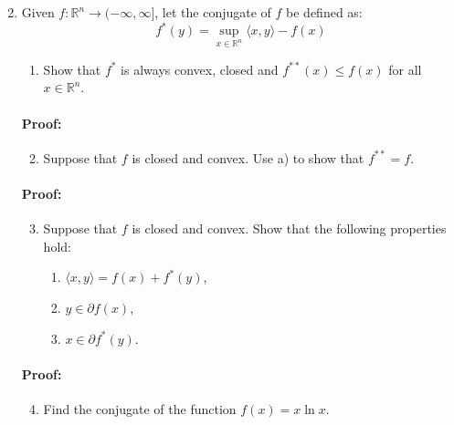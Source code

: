 \documentclass[10pt]{article}
\begin{document}
\blindtext

\begin{enumerate}[label=\alph*)]
\setcounter{enumi}{1}
\item Given $f: \mathbb{R}^n \rightarrow (- \infty, \infty]$, let the conjugate of $f$ be defined as: $$ f^*(y) = \sup_{x \in \mathbb{R}^n} \langle x, y \rangle - f(x) $$ 

\begin{enumerate}[label=\arabic*)]
  \item Show that $f^*$ is always convex, closed and $f^{**}(x) \leq f(x)$ for all $x \in \mathbb{R}^n$.
\end{enumerate}

\paragraph{Proof:}


\blindtext

\begin{enumerate}[label=\arabic*)]
  \setcounter{enumii}{1}
  \item Suppose that $f$ is closed and convex. Use a) to show that $f^{**} = f$.
\end{enumerate}

\paragraph{Proof:}


\blindtext


\begin{enumerate}[label=\arabic*)]
  \setcounter{enumii}{2}
  \item Suppose that $f$ is closed and convex. Show that the following properties hold:
  
\begin{enumerate}[label=(\roman*)]
  \item $\langle x,y \rangle = f(x) + f^*(y)$,
  \item $y \in \partial f(x)$,
  \item $x \in \partial f^*(y)$.
\end{enumerate}


\end{enumerate}


\paragraph{Proof:}

\blindtext

\begin{enumerate}[label=\arabic*)]
  \setcounter{enumii}{3}
  \item Find the conjugate of the function $f(x)= x \ln x$.
\end{enumerate}


\end{enumerate}
\end{document}
